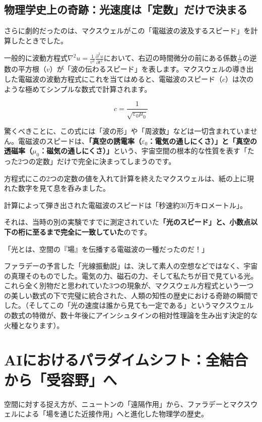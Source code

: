 \subsection{物理学史上の奇跡：光速度は「定数」だけで決まる}

さらに劇的だったのは、マクスウェルがこの「電磁波の波及するスピード」を計算したときでした。

一般的に波動方程式\(\nabla^2 u=\frac{1}{v^2}\frac{\partial^2u}{\partial t^2}\)において、右辺の時間微分の前にある係数\(\frac{1}{v^2}\)の逆数の平方根（\(v\)）が「波の伝わるスピード」を表します。マクスウェルの導き出した電磁波の波動方程式にこれを当てはめると、電磁波のスピード（\(c\)）は次のような極めてシンプルな数式で計算されます。

\[
c=\frac{1}{\sqrt{\varepsilon_0\mu_0}}
\]

驚くべきことに、この式には「波の形」や「周波数」などは一切含まれていません。電磁波のスピードは、\textbf{「真空の誘電率（\(\varepsilon_0\)：電気の通しにくさ）」と「真空の透磁率（\(\mu_0\)：磁気の通しにくさ）」}という、宇宙空間の根本的な性質を表す「たった2つの定数」だけで完全に決まってしまうのです。

方程式にこの2つの定数の値を入れて計算を終えたマクスウェルは、紙の上に現れた数字を見て息を呑みました。

計算によって弾き出された電磁波のスピードは「秒速約30万キロメートル」。

それは、当時の別の実験ですでに測定されていた\textbf{「光のスピード」と、小数点以下の桁に至るまで完全に一致していた}のです。

「光とは、空間の『場』を伝播する電磁波の一種だったのだ！」

ファラデーの予言した「光線振動説」は、決して素人の空想などではなく、宇宙の真理そのものでした。電気の力、磁石の力、そして私たちが目で見ている光。これら全く別物だと思われていた3つの現象が、マクスウェル方程式という一つの美しい数式の下で完璧に統合された、人類の知性の歴史における奇跡の瞬間でした。（そしてこの「光の速度は誰から見ても一定である」というマクスウェルの数式の特徴が、数十年後にアインシュタインの相対性理論を生み出す決定的な火種となります）。

\section{AIにおけるパラダイムシフト：全結合から「受容野」へ}

空間に対する捉え方が、ニュートンの「遠隔作用」から、ファラデーとマクスウェルによる「場を通じた近接作用」へと進化した物理学の歴史。


